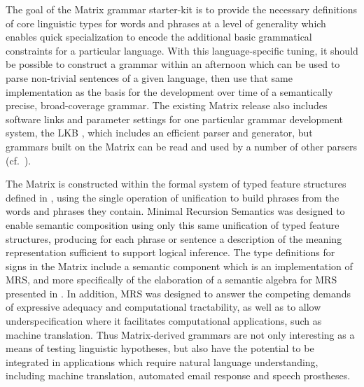 \documentclass[12pt]{article}
\newcommand{\mpt}[1]{\marginpar{\tiny #1}}
\begin{document}
The goal of the Matrix grammar starter-kit is to provide the necessary\mpt{Update to reflect customization system}
definitions of core linguistic types for words and phrases at a level
of generality which enables quick specialization to encode the
additional basic grammatical constraints for a particular language.
With this language-specific tuning, it should be possible to construct
a grammar within an afternoon which can be used to parse non-trivial
sentences of a given language, then use that same implementation as
the basis for the development over time of a semantically precise,
broad-coverage grammar.  The existing Matrix release also includes
software links and parameter settings for one particular grammar
development system, the LKB \cite{Copestake:02}, which includes an
efficient parser and generator, but grammars built on the Matrix can
be read and used by a number of other parsers
(cf.~).

The Matrix is constructed within the formal system of typed feature
structures defined in , using the single operation
of unification to build phrases from the words and phrases they
contain.  Minimal Recursion Semantics was designed to enable semantic
composition using only this same unification of typed feature
structures, producing for each phrase or sentence a description of the
meaning representation sufficient to support logical inference.  The
type definitions for signs in the Matrix include a semantic component
which is an implementation of MRS, and more specifically of the
elaboration of a semantic algebra for MRS presented in
.  In addition, MRS was designed to answer the
competing demands of expressive adequacy and computational
tractability, as well as to allow underspecification where it
facilitates computational applications, such as machine translation.
Thus Matrix-derived grammars are not only interesting as a means of
testing linguistic hypotheses, but also have the potential to be
integrated in applications which require natural language
understanding, including machine translation, automated email response
and speech prostheses.
\end{document}
